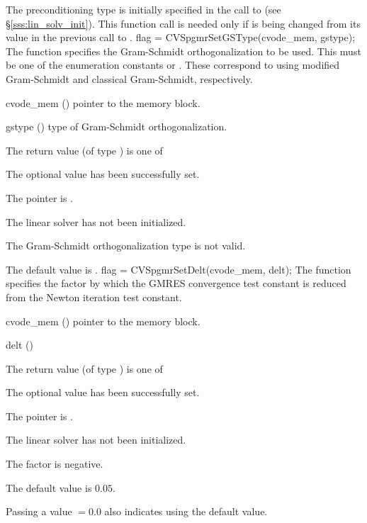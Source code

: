 {
  The preconditioning type is initially specified in the call
  to  (see \S\ref{sss:lin_solv_init}). This function call is
  needed only if  is being changed from its value in the
  previous call to .
}
{
  flag = CVSpgmrSetGSType(cvode\_mem, gstype);
}
{
  The function  specifies the 
  Gram-Schmidt orthogonalization to be used. 
  This must be one of the enumeration constants 
  or . These correspond to using modified Gram-Schmidt 
  and classical Gram-Schmidt, respectively. 
}
{
  \begin{args}
  \item[cvode\_mem] ()
    pointer to the {\cvode} memory block.
  \item[gstype] ()
    type of Gram-Schmidt orthogonalization.
  \end{args}
}
{
  The return value  (of type ) is one of
  \begin{args}
  \item[\Id{CVSPGMR\_SUCCESS}] 
    The optional value has been successfully set.
  \item[\Id{CVSPGMR\_MEM\_NULL}]
    The  pointer is .
  \item[\Id{CVSPGMR\_LMEM\_NULL}]
    The {\cvspgmr} linear solver has not been initialized.
  \item[\Id{CVSPGMR\_ILL\_INPUT}]
    The Gram-Schmidt orthogonalization type  is not valid.
  \end{args}
}
{
  The default value is .
}
{
  flag = CVSpgmrSetDelt(cvode\_mem, delt);
}
{
  The function  specifies the factor by
  which the GMRES convergence test constant is reduced
  from the Newton iteration test constant.
}
{
  \begin{args}
  \item[cvode\_mem] ()
    pointer to the {\cvode} memory block.
  \item[delt] ()

  \end{args}
}
{
  The return value  (of type ) is one of
  \begin{args}
  \item[\Id{CVSPGMR\_SUCCESS}] 
    The optional value has been successfully set.
  \item[\Id{CVSPGMR\_MEM\_NULL}]
    The  pointer is .
  \item[\Id{CVSPGMR\_LMEM\_NULL}]
    The {\cvspgmr} linear solver has not been initialized.
  \item[\Id{CVSPGMR\_ILL\_INPUT}]
    The factor  is negative.  
  \end{args}
}
{
  The default value is $0.05$.

  Passing a value $ = 0.0$ also indicates using the default value.
}

